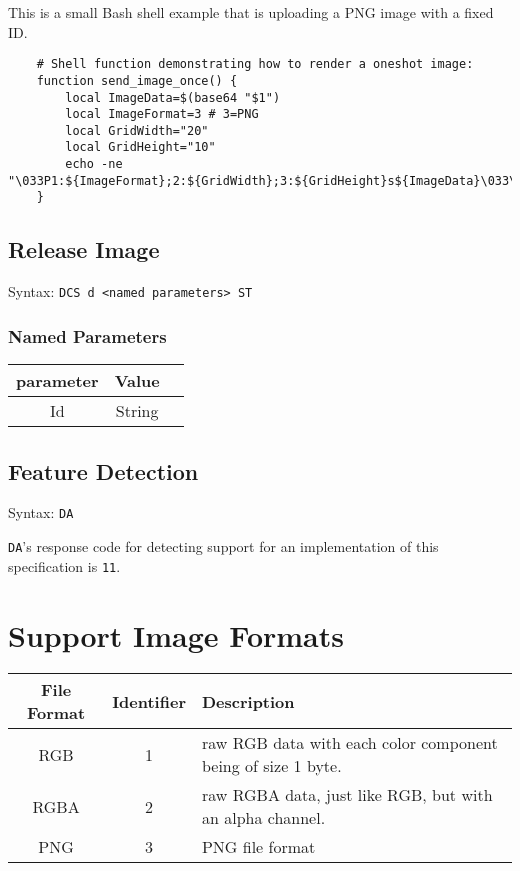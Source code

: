 \documentclass{article}
\newcommand{\code}[1]{\colorbox{light-gray}{\texttt{#1}}}
\newcommand{\DA}{\code{DA}}
\begin{document}
This is a small Bash shell example that is uploading a PNG image with a fixed ID.

\begin{verbatim}
    # Shell function demonstrating how to render a oneshot image:
    function send_image_once() {
        local ImageData=$(base64 "$1")
        local ImageFormat=3 # 3=PNG
        local GridWidth="20"
        local GridHeight="10"
        echo -ne "\033P1:${ImageFormat};2:${GridWidth};3:${GridHeight}s${ImageData}\033\\"
    }
\end{verbatim}

\subsection{Release Image}

Syntax: \code{DCS d <named parameters> ST}

\subsubsection*{Named Parameters}

\begin{tabular}{ |c|c|l| }
    \hline
    \textbf{parameter}   & \textbf{Value} \\
    \hline
    Id          & String \\
    \hline
\end{tabular}

\subsection{Feature Detection}

Syntax: \DA

\DA's response code for detecting support for an implementation of this specification is \code{11}.

\section{Support Image Formats} %

\label{sec:supported-image-formtats}

\begin{tabular}{c | c | l}
    File Format & Identifier & Description \\ \hline
    RGB & 1 & raw RGB data with each color component being of size 1 byte. \\
    RGBA & 2 & raw RGBA data, just like RGB, but with an alpha channel. \\
    PNG & 3 & PNG file format \\
\end{tabular}
\end{document}

